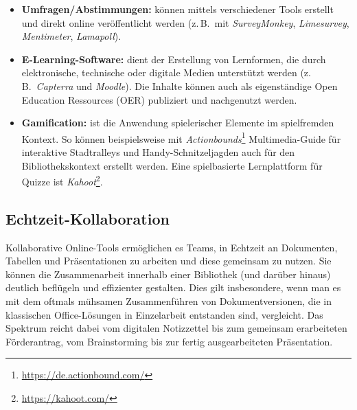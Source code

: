 \documentclass[
  11pt,
  letterpaper,
  DIV=11,
  twoside]{scrreprt}
\DeclareRobustCommand{\href}[2]{#2\footnote{\url{#1}}}
\begin{document}
\begin{itemize}
  \emph{\href{https://sendegate.de}{Sendegate}} oder im
  \href{https://bibtutorials.miraheze.org/wiki/Hauptseite\#Technik}{Wiki
  des Netzwerkes „Tutorials in Bibliotheken``}
\item
  \textbf{Umfragen/Abstimmungen:} können mittels verschiedener Tools
  erstellt und direkt online veröffentlicht werden (z.\,B.~mit
  \emph{SurveyMonkey}, \emph{Limesurvey}, \emph{Mentimeter},
  \emph{Lamapoll}).
\item
  \textbf{E-Learning-Software:} dient der Erstellung von Lernformen, die
  durch elektronische, technische oder digitale Medien unterstützt
  werden (z.\,B.~\emph{Capterra} und \emph{Moodle}). Die Inhalte können
  auch als eigenständige Open Education Ressources ({OER}) publiziert
  und nachgenutzt werden.
\item
  \textbf{Gamification:} ist die Anwendung spielerischer Elemente im
  spielfremden Kontext. So können beispielsweise mit
  \href{https://de.actionbound.com/}{\emph{Actionbounds}}
  Multimedia-Guide für interaktive Stadtralleys und
  Handy-Schnitzeljagden auch für den Bibliothekskontext erstellt werden.
  Eine spielbasierte Lernplattform für Quizze ist
  \href{https://kahoot.com/}{\emph{Kahoot}}.
\end{itemize}

\subsection{Echtzeit-Kollaboration}\label{echtzeit-kollaboration}

Kollaborative Online-Tools ermöglichen es Teams, in Echtzeit an
Dokumenten, Tabellen und Präsentationen zu arbeiten und diese gemeinsam
zu nutzen. Sie können die Zusammenarbeit innerhalb einer Bibliothek (und
darüber hinaus) deutlich beflügeln und effizienter gestalten. Dies gilt
insbesondere, wenn man es mit dem oftmals mühsamen Zusammenführen von
Dokumentversionen, die in klassischen Office-Lösungen in Einzelarbeit
entstanden sind, vergleicht. Das Spektrum reicht dabei vom digitalen
Notizzettel bis zum gemeinsam erarbeiteten Förderantrag, vom
Brainstorming bis zur fertig ausgearbeiteten Präsentation.
\end{document}
